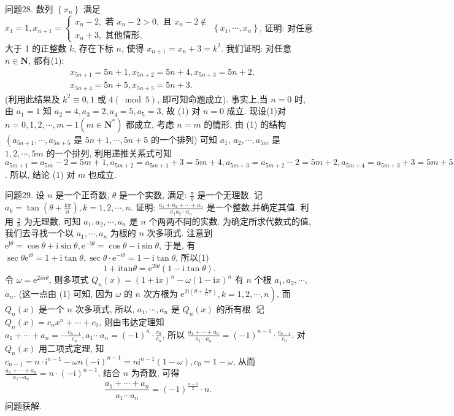问题28. 数列 $\left\{x_n\right\}$ 满足 $x_1=1, x_{n+1}=\left\{\begin{array}{l}x_n-2, \text { 若 } x_n-2>0, \text { 且 } x_n-2 \notin \\ x_n+3, \text { 其他情形, }\end{array}\right. \left\{x_1, \cdots, x_n\right\}$, 证明: 对任意大于 1 的正整数 $k$, 存在下标 $n$, 使得 $x_{n+1}= x_n+3=k^2$.
我们证明: 对任意 $n \in \mathbf{N}$, 都有(1):
$$
\begin{aligned}
& x_{5 n+1}=5 n+1, x_{5 n+2}=5 n+4, x_{5 n+3}=5 n+2, \\
& x_{5 n+4}=5 n+5, x_{5 n+5}=5 n+3 .
\end{aligned}
$$
(利用此结果及 $k^2 \equiv 0,1$ 或 $4(\bmod 5)$, 即可知命题成立).
事实上,当 $n=0$ 时, 由 $a_1=1$ 知 $a_2=4, a_3=2, a_4=5, a_5=3$, 故 (1) 对 $n=0$ 成立.
现设(1)对 $n=0,1,2, \cdots, m-1\left(m \in \mathbf{N}^*\right)$ 都成立, 考虑 $n=m$ 的情形, 由 (1) 的结构 $\left(a_{5 n+1}, \cdots, a_{5 n+5}\right.$ 是 $5 n+1, \cdots, 5 n+5$ 的一个排列) 可知 $a_1$, $a_2, \cdots, a_{5 m}$ 是 $1,2, \cdots, 5 m$ 的一个排列, 利用递推关系式可知 $a_{5 m+1}=a_{5 m}- 2=5 m+1, a_{5 m+2}=a_{5 m+1}+3=5 m+4, a_{5 m+3}=a_{5 m+2}-2=5 m+2, a_{5 m+4}= a_{5 m+3}+3=5 m+5, a_{5 m+5}=a_{5 m+4}-2=5 m+2$. 所以, 结论 (1) 对 $m$ 也成立.



问题29. 设 $n$ 是一个正奇数, $\theta$ 是一个实数, 满足: $\frac{\pi}{\theta}$ 是一个无理数.
记 $a_k= \tan \left(\theta+\frac{k \pi}{n}\right), k=1,2, \cdots, n$. 证明: $\frac{a_1+a_2+\cdots+a_n}{a_1 a_2 \cdots a_n}$ 是一个整数,并确定其值.
利用 $\frac{\pi}{\theta}$ 为无理数, 可知 $a_1, a_2, \cdots, a_n$ 是 $n$ 个两两不同的实数.
为确定所求代数式的值, 我们去寻找一个以 $a_1, \cdots, a_n$ 为根的 $n$ 次多项式.
注意到 $\mathrm{e}^{\mathrm{i} \theta}=\cos \theta+\mathrm{i} \sin \theta, \mathrm{e}^{-\mathrm{i} \theta}=\cos \theta-\mathrm{i} \sin \theta$, 于是, 有 $\sec \theta \mathrm{e}^{\mathrm{i} \theta}= 1+\mathrm{i} \tan \theta, \sec \theta \cdot \mathrm{e}^{-\mathrm{i} \theta}=1-\mathrm{i} \tan \theta$, 所以(1)
$$
1+\mathrm{itan} \theta=\mathrm{e}^{2 \mathrm{i} \theta}(1-\mathrm{i} \tan \theta) .
$$
令 $\omega=\mathrm{e}^{2 i n \theta}$, 则多项式 $Q_n(x)=(1+\mathrm{i} x)^n-\omega(1-\mathrm{i} x)^n$ 有 $n$ 个根 $a_1, a_2, \cdots$, $a_n$. (这一点由 (1) 可知, 因为 $\omega$ 的 $n$ 次方根为 $\left.\mathrm{e}^{2 \mathrm{i}\left(\theta+\frac{k}{n} \pi\right)}, k=1,2, \cdots, n\right)$, 而 $Q_n(x)$ 是一个 $n$ 次多项式, 所以, $a_1, \cdots, a_n$ 是 $Q_n(x)$ 的所有根.
记 $Q_n(x)=c_n x^n+\cdots+c_0$, 则由韦达定理知 $a_1+\cdots+a_n=-\frac{c_{n-1}}{c_n}, a_1 \cdots a_n=(-1)^n \cdot \frac{c_0}{c_n}$, 所以 $\frac{a_1+\cdots+a_n}{a_1 \cdots a_n}=(-1)^{n-1} \cdot \frac{c_{n-1}}{c_0}$.
对 $Q_n(x)$ 用二项式定理, 知 $c_{n-1}=n \cdot \mathrm{i}^{n-1}-\omega n(-\mathrm{i})^{n-1}=n \mathrm{i}^{n-1}(1-\omega), c_0= 1-\omega$, 从而 $\frac{a_1+\cdots+a_n}{a_1 \cdots a_n}=n \cdot(-\mathrm{i})^{n-1}$, 结合 $n$ 为奇数, 可得
$$
\frac{a_1+\cdots+a_n}{a_1 \cdots a_n}=(-1)^{\frac{n-1}{2}} \cdot n \text {. }
$$
问题获解.



